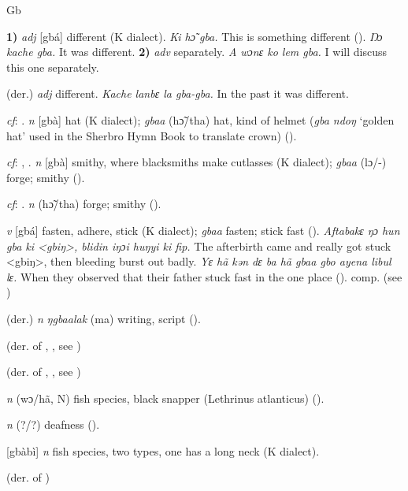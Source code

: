 \begin{letter}{Gb}

 \textbf{1)} \textit{adj} [gbá] different (K dialect). \textit{Ki hɔ̃ gba.} This is something different (\citealt{Pichl1967}). \textit{Ŋɔ kache gba.} It was different. \textbf{2)} \textit{adv} separately. \textit{A wɔnɛ ko lem gba.} I will discuss this one separately. 

 (der.) \textit{adj} different. \textit{Kache lanbɛ la gba-gba.} In the past it was different.

 \textit{cf}: . \textit{n} [gbà] hat (K dialect); \textit{gbaa} (hɔ̃/tha) hat, kind of helmet (\textit{gba ndoŋ} ‘golden hat' used in the Sherbro Hymn Book to translate crown) (\citealt{Pichl1967}). 

 \textit{cf}: , . \textit{n} [gbà] smithy, where blacksmiths make cutlasses (K dialect); \textit{gbaa} (lɔ/-) forge; smithy (\citealt{Pichl1967}).

 \textit{cf}: . \textit{n} (hɔ̃/tha) forge; smithy (\citealt{Pichl1967}). 

 \textit{v} [gbá] fasten, adhere, stick (K dialect); \textit{gbaa} fasten; stick fast (\citealt{Pichl1967}). \textit{Aftabakɛ ŋɔ hun gba ki <gbiŋ>, blidin iŋɔi huŋyi ki fip.} The afterbirth came and really got stuck <gbiŋ>, then bleeding burst out badly. \textit{Yɛ hã kən dɛ ba hã gbaa gbo ayena libul lɛ.} When they observed that their father stuck fast in the one place (\citealt{Pichl1967}). comp.  (see ) 

 (der.) \textit{n} \textit{ŋgbaalak} (ma) writing, script (\citealt{Pichl1967}). 

 (der. of , , see ) 

 (der. of , , see )

 \textit{n} (wɔ/hã, N) fish species, black snapper (Lethrinus atlanticus) (\citealt{Pichl1967}). 

 \textit{n} (?/?) deafness (\citealt{Pichl1967}). 

 [gbàbì] \textit{n} fish species, two types, one has a long neck (K dialect). 

 (der. of ) 


\end{letter}
